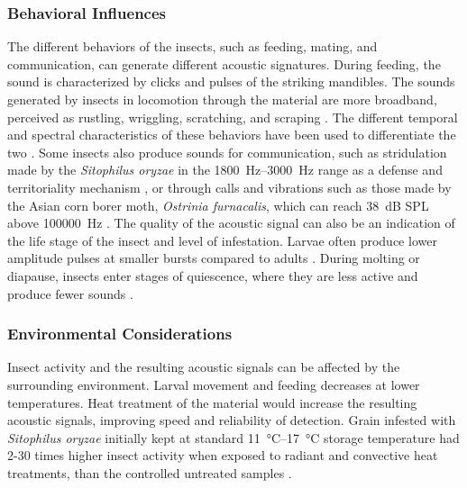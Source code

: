 \documentclass[../Vibro-Acoustic Signatures and Detection Algorithms for Stored Product Insects.tex]{subfiles}
\begin{document}
\subsubsection{Behavioral Influences}

The different behaviors of the insects, such as feeding, mating, and communication, can generate different acoustic signatures. During feeding, the sound is characterized by clicks and pulses of the striking mandibles. The sounds generated by insects in locomotion through the material are more broadband, perceived as rustling, wriggling, scratching, and scraping \cite{mankinAcousticIndicatorsTargeted2010}. The different temporal and spectral characteristics of these behaviors have been used to differentiate the two \cite{mousaviAcousticDetectionPossibility2017}. Some insects also produce sounds for communication, such as stridulation made by the \textit{Sitophilus oryzae} in the \SIrange{1800}{3000}{\hertz} range as a defense and territoriality mechanism \cite{gibsonStridulatoryMechanismsSound1967}, or through calls and vibrations such as those made by the Asian corn borer moth, \textit{Ostrinia furnacalis}, which can reach \SI{38}{\deci\bel} SPL above \SI{100000}{\hertz} \cite{nakanoMothsAreNot2009}. The quality of the acoustic signal can also be an indication of the life stage of the insect and level of infestation. Larvae often produce lower amplitude pulses at smaller bursts compared to adults \cite{njorogeFrequencyTimePattern2016, njorogeBioacousticsAcanthoscelidesObtectus2017}. During molting or diapause, insects enter stages of quiescence, where they are less active and produce fewer sounds \cite{shadeDetectionHiddenInsect1990,mankinThermalTreatmentsIncrease1999,njorogeOxygenConsumptionAcoustic2018}.

\newpage
\subsubsection{Environmental Considerations}

Insect activity and the resulting acoustic signals can be affected by the surrounding environment. Larval movement and feeding decreases at lower temperatures. Heat treatment of the material would increase the resulting acoustic signals, improving speed and reliability of detection. Grain infested with \textit{Sitophilus oryzae} initially kept at standard \SIrange{11}{17}{\degreeCelsius} storage temperature had 2-30 times higher insect activity when exposed to radiant and convective heat treatments, than the controlled untreated samples \cite{mankinThermalTreatmentsIncrease1999}.
\end{document}
